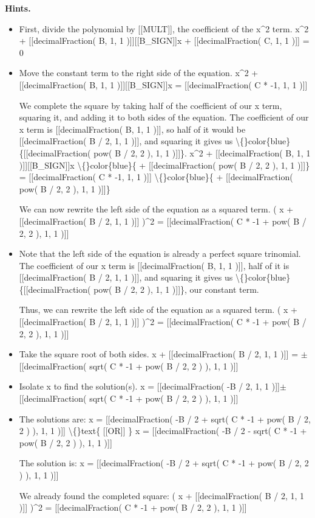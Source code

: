 \documentclass{article}
\begin{document}
\textbf{Hints.}
\begin{itemize}
  \item First, divide the polynomial by [[MULT]], the coefficient of the x\textasciicircum{}2 term.
                x\textasciicircum{}2  + [[decimalFraction( B, 1, 1 )]][[B\_SIGN]]x + [[decimalFraction( C, 1, 1 )]] = 0
  \item Move the constant term to the right side of the equation.
                    x\textasciicircum{}2  + [[decimalFraction( B, 1, 1 )]][[B\_SIGN]]x = [[decimalFraction( C * -1, 1, 1 )]]
                
                
                    We complete the square by taking half of the coefficient of our x term, squaring it, and adding it to both sides of the equation. The coefficient of our x term is [[decimalFraction( B, 1, 1 )]], so half of it would be [[decimalFraction( B / 2, 1, 1 )]], and squaring it gives us \textbackslash\{\}color\{blue\}\{[[decimalFraction( pow( B / 2, 2 ), 1, 1 )]]\}.
                    x\textasciicircum{}2  + [[decimalFraction( B, 1, 1 )]][[B\_SIGN]]x \textbackslash\{\}color\{blue\}\{ + [[decimalFraction( pow( B / 2, 2 ), 1, 1 )]]\} = [[decimalFraction( C * -1, 1, 1 )]] \textbackslash\{\}color\{blue\}\{ + [[decimalFraction( pow( B / 2, 2 ), 1, 1 )]]\}
                
                
                    We can now rewrite the left side of the equation as a squared term.
                    ( x + [[decimalFraction( B / 2, 1, 1 )]] )\textasciicircum{}2 = [[decimalFraction( C * -1 + pow( B / 2, 2 ), 1, 1 )]]
  \item Note that the left side of the equation is already a perfect square trinomial. The coefficient of our x term is [[decimalFraction( B, 1, 1 )]], half of it is [[decimalFraction( B / 2, 1, 1 )]], and squaring it gives us \textbackslash\{\}color\{blue\}\{[[decimalFraction( pow( B / 2, 2 ), 1, 1 )]]\}, our constant term.
                
                    Thus, we can rewrite the left side of the equation as a squared term.
                    ( x + [[decimalFraction( B / 2, 1, 1 )]] )\textasciicircum{}2 = [[decimalFraction( C * -1 + pow( B / 2, 2 ), 1, 1 )]]
  \item Take the square root of both sides.
                x  + [[decimalFraction( B / 2, 1, 1 )]] = $\pm$[[decimalFraction( sqrt( C * -1 + pow( B / 2, 2 ) ), 1, 1 )]]
  \item Isolate x to find the solution(s).
                x = [[decimalFraction( -B / 2, 1, 1 )]]$\pm$[[decimalFraction( sqrt( C * -1 + pow( B / 2, 2 ) ), 1, 1 )]]
  \item The solutions are: x = [[decimalFraction( -B / 2 + sqrt( C * -1 + pow( B / 2, 2 ) ), 1, 1 )]] \textbackslash\{\}text\{ [[OR]] \} x = [[decimalFraction( -B / 2 - sqrt( C * -1 + pow( B / 2, 2 ) ), 1, 1 )]]
                
                
                    The solution is: x = [[decimalFraction( -B / 2 + sqrt( C * -1 + pow( B / 2, 2 ) ), 1, 1 )]]
                
                We already found the completed square: ( x + [[decimalFraction( B / 2, 1, 1 )]] )\textasciicircum{}2 = [[decimalFraction( C * -1 + pow( B / 2, 2 ), 1, 1 )]]
\end{itemize}
\end{document}
